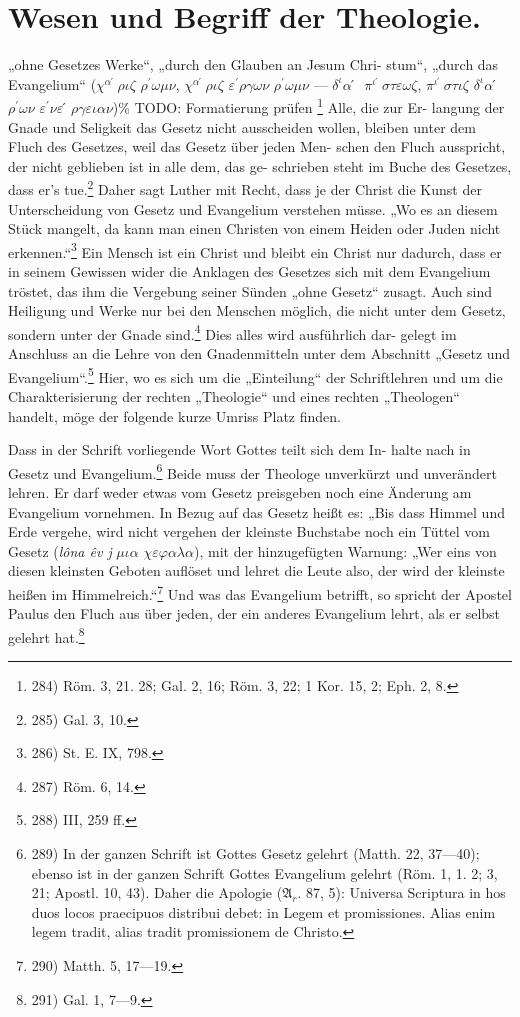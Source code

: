 \setcounter{page}{86}
\section*{Wesen und Begriff der Theologie.}

„ohne Gesetzes Werke“, „durch den Glauben an Jesum Chri-
stum“, „durch das Evangelium“ ($\chi^{\alpha ́}\rho\iota\zeta$ $\rho^{\prime}\omega\mu\nu$, $\chi^{\alpha ́}\rho\iota\zeta$ $\varepsilon^{\prime}\rho\gamma\omega\nu$ $\rho^{\prime}\omega\mu\nu$
— $\delta^{\iota}\alpha ́$ $\pi^{\iotá}\sigma\tau\varepsilon\omega\zeta$, $\pi^{\iotá}\sigma\tau\iota\zeta$ $\delta^{\iota} \alpha ́$ $\rho^{\prime}\omega\nu$ $\varepsilon^{\prime}\nu\varepsilon ́\rho\gamma\varepsilon\iota\alpha\nu$)\% TODO: Formatierung prüfen
\footnote{284) Röm. 3, 21. 28; Gal. 2, 16; Röm. 3, 22; 1 Kor. 15, 2; Eph. 2, 8.} Alle, die zur Er-
langung der Gnade und Seligkeit das Gesetz nicht ausscheiden wollen,
bleiben unter dem Fluch des Gesetzes, weil das Gesetz über jeden Men-
schen den Fluch ausspricht, der nicht geblieben ist in alle dem, das ge-
schrieben steht im Buche des Gesetzes, dass er’s tue.\footnote{285) Gal. 3, 10.} Daher sagt
Luther mit Recht, dass je der Christ die Kunst der Unterscheidung
von Gesetz und Evangelium verstehen müsse. „Wo es an diesem Stück
mangelt, da kann man einen Christen von einem Heiden oder Juden
nicht erkennen.“\footnote{286) St. E. IX, 798.} Ein Mensch ist ein Christ und bleibt ein
Christ nur dadurch, dass er in seinem Gewissen wider die Anklagen
des Gesetzes sich mit dem Evangelium tröstet, das ihm die Vergebung
seiner Sünden „ohne Gesetz“ zusagt. Auch sind Heiligung und
Werke nur bei den Menschen möglich, die nicht unter dem Gesetz,
sondern unter der Gnade sind.\footnote{287) Röm. 6, 14.} Dies alles wird ausführlich dar-
gelegt im Anschluss an die Lehre von den Gnadenmitteln unter dem
Abschnitt „Gesetz und Evangelium“.\footnote{288) III, 259 ff.} Hier, wo es sich um die
„Einteilung“ der Schriftlehren und um die Charakterisierung der
rechten „Theologie“ und eines rechten „Theologen“ handelt, möge
der folgende kurze Umriss Platz finden.

Dass in der Schrift vorliegende Wort Gottes teilt sich dem In-
halte nach in Gesetz und Evangelium.\footnote{289) In der ganzen Schrift ist Gottes Gesetz gelehrt (Matth. 22, 37—40);
ebenso ist in der ganzen Schrift Gottes Evangelium gelehrt (Röm. 1, 1. 2; 3, 21;
Apostl. 10, 43). Daher die Apologie ($\mathfrak{A}_{r}$. 87, 5): Universa Scriptura in hos duos
locos praecipuos distribui debet: in Legem et promissiones. Alias enim legem
tradit, alias tradit promissionem de Christo.} Beide muss der Theologe
unverkürzt und unverändert lehren. Er darf weder etwas vom Gesetz
preisgeben noch eine Änderung am Evangelium vornehmen. In
Bezug auf das Gesetz heißt es: „Bis dass Himmel und Erde vergehe,
wird nicht vergehen der kleinste Buchstabe noch ein Tüttel vom Gesetz
(\textit{lôna êv j} $\mu\iota\alpha$ $\chi\varepsilon\varphi\alpha\lambda\alpha$), mit der hinzugefügten Warnung: „Wer
eins von diesen kleinsten Geboten auflöset und lehret die Leute also,
der wird der kleinste heißen im Himmelreich.“\footnote{290) Matth. 5, 17—19.} Und was das
Evangelium betrifft, so spricht der Apostel Paulus den Fluch aus über
jeden, der ein anderes Evangelium lehrt, als er selbst gelehrt hat.\footnote{291) Gal. 1, 7—9.}